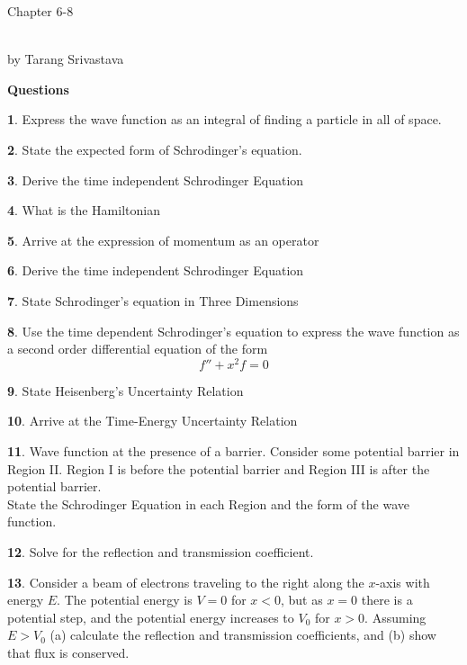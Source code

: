 \documentclass[11pt, twocolumn]{article}
\author{Tarang Srivastava}
\newcommand{\makechaptertitle}[1]{
\begin{center}
	\begin{large}
		#1
	\end{large}
	\begin{small}
		\\by Tarang Srivastava
	\end{small}
\end{center}
}
\theoremstyle{definition}
\newtheorem{q}{}
\begin{document}
	\makechaptertitle{Chapter 6-8}
	\textbf{Questions}
	\begin{q}
		Express the wave function as an integral of finding a particle in all of space.
	\end{q}
	\begin{q}
		State the expected form of Schrodinger's equation.
	\end{q}
	\begin{q}
		Derive the time independent Schrodinger Equation
	\end{q}
	\begin{q}
		What is the Hamiltonian
	\end{q}
	\begin{q}
		Arrive at the expression of momentum as an operator
	\end{q}
	\begin{q}
		Derive the time independent Schrodinger Equation
	\end{q}
	\begin{q}
		State Schrodinger's equation in Three Dimensions
	\end{q}
	\begin{q}
		Use the time dependent Schrodinger's equation to express the wave function as a second order differential equation of the form 
		\[ f'' + x^2f = 0 \]
	\end{q}
	\begin{q}
		State Heisenberg's Uncertainty Relation
	\end{q}
	\begin{q}
		Arrive at the Time-Energy Uncertainty Relation
	\end{q}
	\begin{q}
		Wave function at the presence of a barrier. Consider some potential barrier in Region II. Region I is before the potential barrier and Region III is after the potential barrier.\\
		State the Schrodinger Equation in each Region and the form of the wave function.
	\end{q}
	\begin{q}
		Solve for the reflection and transmission coefficient.
	\end{q}
	\begin{q}
		Consider a beam of electrons traveling to the right along the $ x$-axis with energy $ E $. The potential energy is $ V = 0 $ for $ x < 0 $, but as $ x = 0 $ there is a potential step, and the potential energy increases to $ V_0 $ for $ x > 0 $. Assuming $ E > V_0 $ (a) calculate the reflection and transmission coefficients, and (b) show that flux is conserved. 
	\end{q}

	
\end{document}
